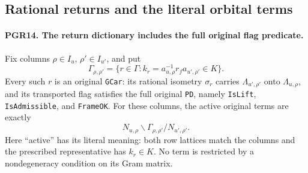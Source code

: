 \documentclass[11pt,a4paper]{article}
\numberwithin{equation}{section}
\theoremstyle{remark}\newtheorem{remark}[theorem]{Remark}
\begin{document}
\subsection{Rational returns and the literal orbital terms}

\paragraph{PGR14. The return dictionary includes the full original flag predicate.}
\label{claim:PGR14}
Fix columns \(\rho\in I_u\), \(\rho'\in I_{u'}\), and put
\[
 \Gamma_{\rho,\rho'}=
 \{r\in\Gamma:k_r=a_{u,\rho}^{-1}r_fa_{u',\rho'}\in K\}.
\tag{PGR.33}
\]
Every such \(r\) is an original \texttt{GCar}: its rational
isometry \(\sigma_r\) carries \(\Lambda_{u',\rho'}\)
onto \(\Lambda_{u,\rho}\), and its transported flag satisfies
the full original \texttt{PD}, namely \texttt{Is\allowbreak Lift},
\texttt{Is\allowbreak Admissible}, and \texttt{Frame\allowbreak OK}.  For these columns,
the active original terms are exactly
\[
       N_{u,\rho}\backslash
                 \Gamma_{\rho,\rho'}/N_{u',\rho'}.
\tag{PGR.34}
\]
Here ``active'' has its literal meaning: both row lattices match the
columns and the prescribed representative has \(k_r\in K\).
No term is restricted by a nondegeneracy condition on its Gram matrix.
\end{document}
